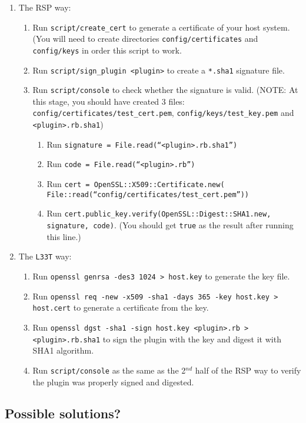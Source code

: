\documentclass{article}
\begin{document}
\begin{enumerate}
	\item The RSP way:
		\begin{enumerate}
			\item Run \texttt{script/create\_cert} to generate a certificate of your host system. (You will need to create directories \texttt{config/certificates} and \texttt{config/keys} in order this script to work. 
			\item Run \texttt{script/sign\_plugin <plugin>} to create a \texttt{*.sha1} signature file. 
			\item Run \texttt{script/console} to check whether the signature is valid. (NOTE: At this stage, you should have created 3 files: \texttt{config/certificates/test\_cert.pem}, \texttt{config/keys/test\_key.pem} and \texttt{<plugin>.rb.sha1})
				\begin{enumerate}
					\item Run \texttt{signature = File.read(``<plugin>.rb.sha1'')}
					\item Run \texttt{code = File.read(``<plugin>.rb'')}
					\item Run \texttt{cert = OpenSSL::X509::Certificate.new( \\ File::read(``config/certificates/test\_cert.pem''))}
					\item Run \texttt{cert.public\_key.verify(OpenSSL::Digest::SHA1.new, signature, code)}. (You should get \texttt{true} as the result after running this line.)
				\end{enumerate}
		\end{enumerate}
	\item The \texttt{L33T} way:
		\begin{enumerate}
			\item Run \texttt{openssl genrsa -des3 1024 > host.key} to generate the key file.
			\item Run \texttt{openssl req -new -x509 -sha1 -days 365 -key host.key > host.cert} to generate a certificate from the key.
			\item Run \texttt{openssl dgst -sha1 -sign host.key <plugin>.rb > <plugin>.rb.sha1} to sign the plugin with the key and digest it with SHA1 algorithm.
			\item Run \texttt{script/console} as the same as the 2$^{nd}$ half of the RSP way to verify the plugin was properly signed and digested. 
		\end{enumerate}
\end{enumerate}

\subsection*{Possible solutions?}
\end{document}
